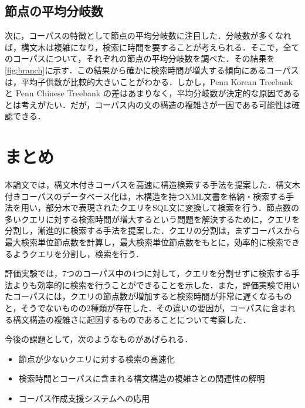 \documentclass[japanese]{jnlp_1.3e}
\begin{document}
\subsection{節点の平均分岐数}

次に，コーパスの特徴として節点の平均分岐数に注目した．分岐数が多くなれば，構文木は複雑になり，検索に時間を要することが考えられる．そこで，全てのコーパスについて，それぞれの節点の平均分岐数を調べた．その結果を\figurename\ref{fig:branch}に示す．この結果から確かに検索時間が増大する傾向にあるコーパスは，平均子供数が比較的大きいことがわかる．しかし，Penn Korean Treebank と Penn Chinese Treebank の差はあまりなく，平均分岐数が決定的な原因であるとは考えがたい．だが，コーパス内の文の構造の複雑さが一因である可能性は確認できる．



\section{まとめ}

本論文では，構文木付きコーパスを高速に構造検索する手法を提案した．構文木付きコーパスのデータベース化は，木構造を持つXML文書を格納・検索する手法を用い，部分木で表現されたクエリをSQL文に変換して検索を行う．節点数の多いクエリに対する検索時間が増大するという問題を解決するために，クエリを分割し，漸進的に検索する手法を提案した．クエリの分割は，まずコーパスから最大検索単位節点数を計算し，最大検索単位節点数をもとに，効率的に検索できるようクエリを分割し，検索を行う．

評価実験では，7つのコーパス中の4つに対して，クエリを分割せずに検索する手法よりも効率的に検索を行うことができることを示した．また，評価実験で用いたコーパスには，クエリの節点数が増加すると検索時間が非常に遅くなるものと，そうでないものの2種類が存在した．その違いの要因が，コーパスに含まれる構文構造の複雑さに起因するものであることについて考察した．

今後の課題として，次のようなものがあげられる．
\begin{itemize}
\item 節点が少ないクエリに対する検索の高速化
\item 検索時間とコーパスに含まれる構文構造の複雑さとの関連性の解明
\item コーパス作成支援システムへの応用
\end{itemize}
\end{document}
